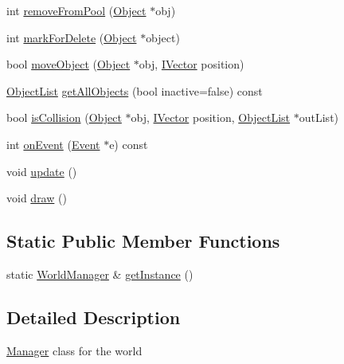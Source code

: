 \begin{DoxyCompactItemize}
\item 
int \hyperlink{class_world_manager_a36b651e832cb1d874b1412576843259f}{remove\+From\+Pool} (\hyperlink{class_object}{Object} $\ast$obj)
\item 
int \hyperlink{class_world_manager_a00279b75512da5e81ea5d13828b6f912}{mark\+For\+Delete} (\hyperlink{class_object}{Object} $\ast$object)
\item 
bool \hyperlink{class_world_manager_ad5cbaffc272fbf2ad79a7ea6cfbd3cf6}{move\+Object} (\hyperlink{class_object}{Object} $\ast$obj, \hyperlink{class_i_vector}{I\+Vector} position)
\item 
\hyperlink{class_object_list}{Object\+List} \hyperlink{class_world_manager_a07ba6788c3fece725cbb9d4917fb9682}{get\+All\+Objects} (bool inactive=false) const 
\item 
bool \hyperlink{class_world_manager_ac658218a84a78dc0610890a5b486d70d}{is\+Collision} (\hyperlink{class_object}{Object} $\ast$obj, \hyperlink{class_i_vector}{I\+Vector} position, \hyperlink{class_object_list}{Object\+List} $\ast$out\+List)
\item 
int \hyperlink{class_world_manager_a72462c64fa931378504f18a2966c303d}{on\+Event} (\hyperlink{class_event}{Event} $\ast$e) const 
\item 
void \hyperlink{class_world_manager_a0ef5e1e476a80ef7715227c6f3a9b6ec}{update} ()
\item 
void \hyperlink{class_world_manager_a0e2c21775041c6943d3cbcbf88601fe7}{draw} ()
\end{DoxyCompactItemize}
\subsection*{Static Public Member Functions}
\begin{DoxyCompactItemize}
\item 
static \hyperlink{class_world_manager}{World\+Manager} \& \hyperlink{class_world_manager_a911e3c4d33b006b21f15f41e90d192d8}{get\+Instance} ()
\end{DoxyCompactItemize}


\subsection{Detailed Description}
\hyperlink{class_manager}{Manager} class for the world 

